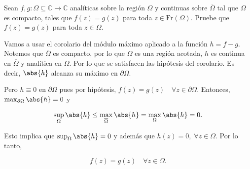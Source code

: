 \documentclass[../main.tex]{subfiles}
\begin{document}
\begin{problema}
    Sean \(f,g \colon \Omega \subseteq \mathbb{C} \to \mathbb{C}\) analíticas sobre la
    región \(\Omega\) y continuas sobre \(\overline{\Omega}\) tal que \(\Omega\) es
    compacto, tales que \(f(z) = g(z)\) para toda \(z\in \mathrm{Fr}(\Omega)\). Pruebe
    que \(f(z) = g(z)\) para toda \(z\in \Omega\).
\end{problema}
\startsolution

Vamos a usar el corolario del módulo máximo aplicado a la función \(h = f - g\). Notemos
que \(\overline{\Omega}\) es compacto, por lo que \(\Omega\) es una región acotada,
\(h\) es continua en \(\overline{\Omega}\) y analítica en \(\Omega\). Por lo que se
satisfacen las hipótesis del corolario. Es decir, \(\abs{h}\) alcanza su máximo en
\(\partial\Omega\).

Pero \( h \equiv 0\) en \(\partial\Omega\) pues por hipótesis, \(f(z) = g(z)\quad
\forall z\in \partial\Omega\). Entonces, \(\max_{\partial\Omega}\abs{h} = 0\) y

\begin{equation*}
    \sup_{\Omega}\abs{h} \leq \max_{\overline{\Omega}}\abs{h} =
    \max_{\Omega}\abs{h} = 0.
\end{equation*}

Esto implica que \(\sup_{\Omega}\abs{h} = 0\) y además que \(h(z) = 0,\; \forall z\in
\Omega\). Por lo tanto,

\begin{equation*}
    f(z) = g(z)\quad \forall z\in \Omega.
\end{equation*}
\end{document}
